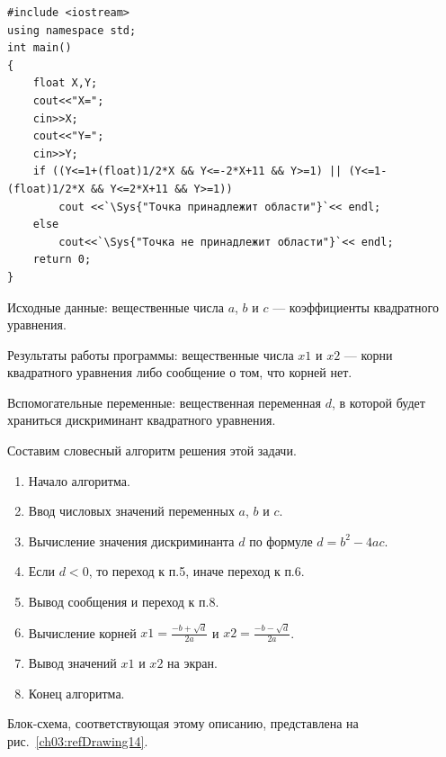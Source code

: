 \begin{lstlisting}
#include <iostream>
using namespace std;
int main()
{
	float X,Y;
	cout<<"X=";
	cin>>X;
	cout<<"Y=";
	cin>>Y;
	if ((Y<=1+(float)1/2*X && Y<=-2*X+11 && Y>=1) || (Y<=1-(float)1/2*X && Y<=2*X+11 && Y>=1))
		cout <<`\Sys{"Точка принадлежит области"}`<< endl;
	else
		cout<<`\Sys{"Точка не принадлежит области"}`<< endl;
	return 0;
}
\end{lstlisting}


Исходные данные: вещественные числа $a$, $b$ и $c$ --- коэффициенты
квадратного уравнения.

Результаты работы программы: вещественные числа $x1$ и $x2$ --- корни квадратного
уравнения либо сообщение о том, что корней нет.

Вспомогательные переменные: вещественная переменная $d$, в которой будет храниться дискриминант
квадратного уравнения.

Составим словесный алгоритм решения этой задачи.
\begin{enumerate}
\item Начало алгоритма.
\item Ввод числовых значений переменных $a$, $b$ и $c$.
\item Вычисление значения дискриминанта $d$ по формуле  $d=b^2-4ac$.
\item Если $d<0$, то переход к п.5, иначе переход к п.6.
\item Вывод сообщения  и переход к п.8.
\item Вычисление корней  $x1=\frac{-b+\sqrt{d}}{2a}$  и  $x2=\frac{-b-\sqrt{d}}{2a}$.
\item Вывод значений $x1$ и $x2$ на экран.
\item Конец алгоритма.
\end{enumerate}
Блок-схема, соответствующая этому описанию, представлена на рис.~\ref{ch03:refDrawing14}.

